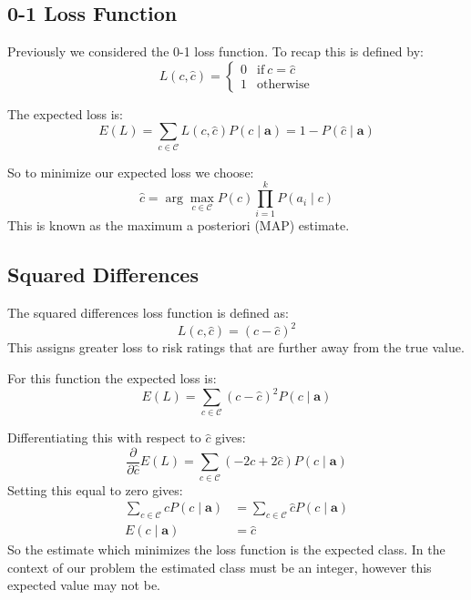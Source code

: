 \subsection{0-1 Loss Function}
Previously we considered the 0-1 loss function.
To recap this is defined by:
\begin{equation}
	L(c, \hat{c}) = 
	\begin{cases}
		0 & \text{if}\ c = \hat{c} \\
		1 & \text{otherwise}
	\end{cases}
\end{equation}

The expected loss is:
\begin{equation}
	E(L) = \sum_{c \in \mathcal{C}} L(c, \hat{c})P(c \mid \mathbf{a}) = 1 - P(\hat{c} \mid \mathbf{a})
\end{equation}

So to minimize our expected loss we choose:
\begin{equation}\label{map}
	\hat c = \arg\max_{c \in \mathcal{C}} P(c)\prod_{i=1}^{k}P(a_i \mid c)
\end{equation}
This is known as the maximum a posteriori (MAP) estimate.

\subsection{Squared Differences}
The squared differences loss function is defined as:
\begin{equation}
	L(c, \hat{c}) = (c - \hat{c})^2
\end{equation}
This assigns greater loss to risk ratings that are further away from the true value.

For this function the expected loss is:
\begin{equation}
	E(L) = \sum_{c \in \mathcal{C}} (c - \hat{c})^2P(c \mid \mathbf{a}) 
\end{equation}

Differentiating this with respect to $\hat{c}$ gives:
\begin{equation}
	\frac{\partial}{\partial \hat{c}} E(L) = \sum_{c \in \mathcal{C}} (-2c + 2\hat{c})P(c \mid \mathbf{a}) 
\end{equation}
Setting this equal to zero gives:
\begin{align}
	\sum_{c \in \mathcal{C}} cP(c \mid \mathbf{a}) & = \sum_{c \in \mathcal{C}} \hat{c}P(c \mid \mathbf{a}) \\
	E(c \mid \mathbf{a}) & = \hat{c}
\end{align}
So the estimate which minimizes the loss function is the expected class.
In the context of our problem the estimated class must be an integer, however this expected value may not be.

